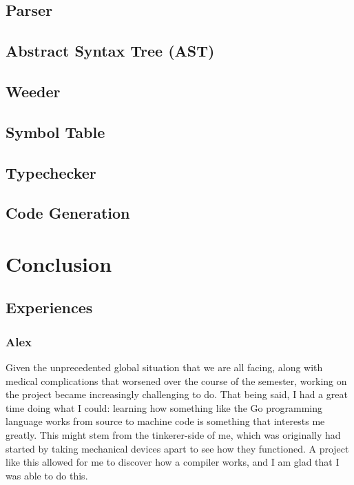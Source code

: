 \documentclass{article}
\begin{document}
\subsection{Parser}


\subsection{Abstract Syntax Tree (AST)}


\subsection{Weeder}


\subsection{Symbol Table}


\subsection{Typechecker}


\subsection{Code Generation}


\section{Conclusion}

\subsection{Experiences}

\subsubsection{Alex}


Given the unprecedented global situation that we are all facing, along with
medical complications that worsened over the course of the semester, working on the project became increasingly challenging to do. That being said, I had a great time doing what I could: learning how something like the Go programming language works from source to machine
code is something that interests me greatly. This might stem from the tinkerer-side of me, which was originally had started by taking mechanical devices apart to see how they functioned. A project like this allowed for me to discover how a compiler works, and I am glad that I was able to do this.
\end{document}
